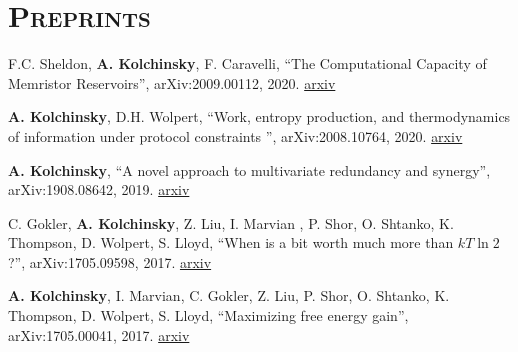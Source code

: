 \section{\textsc{Preprints}}

F.C. Sheldon, \textbf{A. Kolchinsky}, F. Caravelli, ``The Computational Capacity of Memristor Reservoirs'', arXiv:2009.00112, 2020. \href{http://arxiv.org/abs/2009.00112}{arxiv}


\textbf{A. Kolchinsky}, D.H. Wolpert, ``Work, entropy production, and thermodynamics of information under protocol constraints
'', arXiv:2008.10764, 2020. \href{http://arxiv.org/abs/2008.10764}{arxiv}


\textbf{A. Kolchinsky}, ``A novel approach to multivariate redundancy and synergy'', arXiv:1908.08642, 2019. \href{https://arxiv.org/abs/1908.08642}{arxiv}

C. Gokler, \textbf{A. Kolchinsky}, Z. Liu, I. Marvian , P. Shor, O. Shtanko, K. Thompson, D. Wolpert, S. Lloyd, ``When is a bit worth much more than $kT \ln 2$?'', arXiv:1705.09598, 2017. \href{https://arxiv.org/abs/1705.09598}{arxiv}

\textbf{A. Kolchinsky}, I. Marvian, C. Gokler, Z. Liu, P. Shor, O. Shtanko, K. Thompson, D. Wolpert, S. Lloyd, ``Maximizing free energy gain'', arXiv:1705.00041, 2017. \href{https://arxiv.org/abs/1705.00041}{arxiv}

